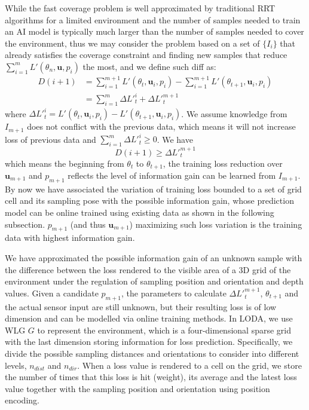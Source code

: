 While the fast coverage problem is well approximated by traditional RRT algorithms for a limited environment and the number of samples needed to train an AI model is typically much larger than the number of samples needed to cover the environment, thus we may consider the problem based on a set of $\{I_i\}$ that already satisfies the coverage constraint and finding new samples that reduce $\sum_{i=1}^{m} L'(\theta_n, \bm{u}, p_i)$ the most, and we define such diff as:
\begin{equation}
  \begin{aligned}
    D(i+1) &= \sum_{i=1}^{m+1} L'(\theta_t, \bm{u}_i, p_i) - \sum_{i=1}^{m+1} L'(\theta_{t+1}, \bm{u}_i, p_{i}) \\
    & = \sum_{i=1}^{m} \Delta {L'}^i_t + \Delta {L'}^{m+1}_t
  \end{aligned}
\end{equation}
where $\Delta {L'}^i_t = L'(\theta_t, \bm{u}_i, p_i) - L'(\theta_{t+1}, \bm{u}_i, p_{i})$.
We assume knowledge from $I_{m+1}$ does not conflict with the previous data, which means it will not increase loss of previous data and $\sum_{i=1}^{m} \Delta {L'}^i_t \geq 0$.
We have 
\begin{equation}
  D(i+1) \geq \Delta {L'}^{m+1}_t
  \label{delta}
\end{equation}
which means the beginning from $\theta_t$ to $\theta_{t+1}$, the training loss reduction over $\bm{u}_{m+1}$ and $p_{m+1}$ reflects the level of information gain can be learned from $I_{m+1}$.
By now we have associated the variation of training loss bounded to a set of grid cell and its sampling pose with the possible information gain, whose prediction model can be online trained using existing data as shown in the following subsection.
$p_{m+1}$ (and thus $\bm{u}_{m+1}$) maximizing such loss variation is the training data with highest information gain.

We have approximated the possible information gain of an unknown sample with the difference between the loss rendered to the visible area of a 3D grid of the environment under the regulation of sampling position and orientation and depth values.
Given a candidate $p_{m+1}$, the parameters to calculate $\Delta {L'}^{m+1}_t$, $\theta_{t+1}$ and the actual sensor input are still unknown, but their resulting loss is of low dimension and can be modelled via online training methods.
In LODA, we use WLG $G$ to represent the environment, which is a four-dimensional sparse grid with the last dimension storing information for loss prediction.
Specifically, we divide the possible sampling distances and orientations to consider into different levels, $n_{dist}$ and $n_{dir}$.
When a loss value is rendered to a cell on the grid, we store the number of times that this loss is hit (weight), its average and the latest loss value together with the sampling position and orientation using position encoding.

